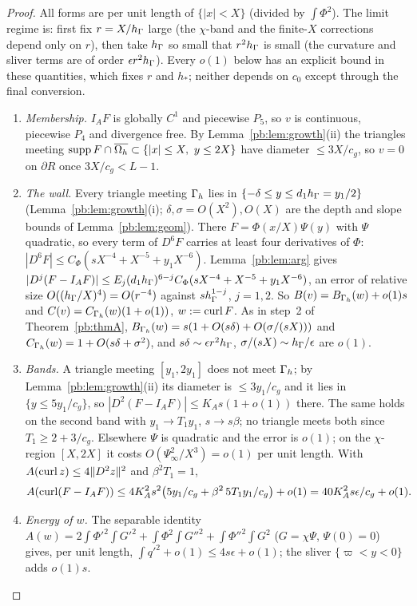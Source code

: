 \begin{proof}
All forms are per unit length of $\{|x|<X\}$ (divided by $\int\Phi^2$). The limit regime is: first fix $r=X/h_\Gamma$ large (the $\chi$-band and the finite-$X$ corrections depend only on $r$), then take $h_\Gamma$ so small that $r^2h_\Gamma$ is small (the curvature and sliver terms are of order $\epsilon r^2h_\Gamma$). Every $o(1)$ below has an explicit bound in these quantities, which fixes $r$ and $h_\ast$; neither depends on $c_0$ except through the final conversion.
\begin{enumerate}[label=\arabic*.]
\item \emph{Membership.} $I_AF$ is globally $C^1$ and piecewise $P_5$, so $v$ is continuous, piecewise $P_4$ and divergence free. By Lemma~\ref{pb:lem:growth}(ii) the triangles meeting $\operatorname{supp}F\cap\overline{\Omega_h}\subset\{|x|\le X,\ y\le2X\}$ have diameter $\le3X/c_g$, so $v=0$ on $\partial R$ once $3X/c_g<L-1$.
\item \emph{The wall.} Every triangle meeting $\Gamma_h$ lies in $\{-\delta\le y\le d_1h_\Gamma=y_1/2\}$ (Lemma~\ref{pb:lem:growth}(i); $\delta,\sigma=O(X^2),O(X)$ are the depth and slope bounds of Lemma~\ref{pb:lem:geom}). There $F=\Phi(x/X)\Psi(y)$ with $\Psi$ quadratic, so every term of $D^6F$ carries at least four derivatives of $\Phi$: $|D^6F|\le C_\Phi(sX^{-4}+X^{-5}+y_1X^{-6})$. Lemma~\ref{pb:lem:arg} gives $|D^j(F-I_AF)|\le E_j(d_1h_\Gamma)^{6-j}C_\Phi(sX^{-4}+X^{-5}+y_1X^{-6})$, an error of relative size $O((h_\Gamma/X)^4)=O(r^{-4})$ against $sh_\Gamma^{1-j}$, $j=1,2$. So $B(v)=B_{\Gamma_h}(w)+o(1)s$ and $C(v)=C_{\Gamma_h}(w)(1+o(1))$, $w:=\operatorname{curl} F$. As in step~2 of Theorem~\ref{pb:thmA}, $B_{\Gamma_h}(w)=s(1+O(s\delta)+O(\sigma/(sX)))$ and $C_{\Gamma_h}(w)=1+O(s\delta+\sigma^2)$, and $s\delta\sim\epsilon r^2h_\Gamma$, $\sigma/(sX)\sim h_\Gamma/\epsilon$ are $o(1)$.
\item \emph{Bands.} A triangle meeting $[y_1,2y_1]$ does not meet $\Gamma_h$; by Lemma~\ref{pb:lem:growth}(ii) its diameter is $\le3y_1/c_g$ and it lies in $\{y\le5y_1/c_g\}$, so $|D^2(F-I_AF)|\le K_As(1+o(1))$ there. The same holds on the second band with $y_1\to T_1y_1$, $s\to s\beta$; no triangle meets both since $T_1\ge2+3/c_g$. Elsewhere $\Psi$ is quadratic and the error is $o(1)$; on the $\chi$-region $[X,2X]$ it costs $O(\Psi_\infty^2/X^3)=o(1)$ per unit length. With $A(\operatorname{curl} z)\le4\lVert D^2z\rVert^2$ and $\beta^2T_1=1$,
\[
A(\operatorname{curl}(F-I_AF))\le4K_A^2s^2\bigl(5y_1/c_g+\beta^2\,5T_1y_1/c_g\bigr)+o(1)=40K_A^2s\epsilon/c_g+o(1).
\]
\item \emph{Energy of $w$.} The separable identity $A(w)=2\int\Phi'^2\int G'^2+\int\Phi^2\int G''^2+\int\Phi''^2\int G^2$ ($G=\chi\Psi$, $\Psi(0)=0$) gives, per unit length, $\int q'^2+o(1)\le4s\epsilon+o(1)$; the sliver $\{\varpi<y<0\}$ adds $o(1)s$.

\end{enumerate}
\end{proof}
